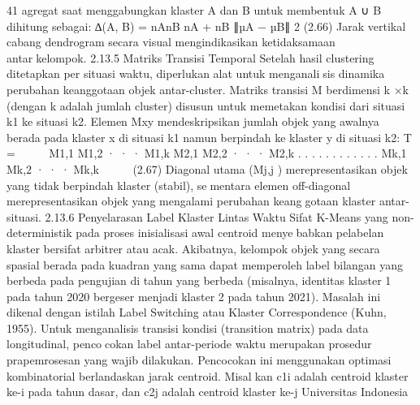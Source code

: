 41
agregat saat menggabungkan klaster A dan B untuk membentuk A ∪ B dihitung sebagai:
∆(A, B) = nAnB
nA + nB
∥µA − µB∥
2
(2.66)
Jarak vertikal cabang dendrogram secara visual mengindikasikan ketidaksamaan antarkelompok.
2.13.5 Matriks Transisi Temporal
Setelah hasil clustering ditetapkan per situasi waktu, diperlukan alat untuk menganalisis dinamika perubahan keanggotaan objek antar-cluster. Matriks transisi M berdimensi
k ×k (dengan k adalah jumlah cluster) disusun untuk memetakan kondisi dari situasi k1 ke
situasi k2. Elemen Mxy mendeskripsikan jumlah objek yang awalnya berada pada klaster
x di situasi k1 namun berpindah ke klaster y di situasi k2:
T =


M1,1 M1,2 · · · M1,k
M2,1 M2,2 · · · M2,k
.
.
.
.
.
.
.
.
.
.
.
.
Mk,1 Mk,2 · · · Mk,k


(2.67)
Diagonal utama (Mj,j ) merepresentasikan objek yang tidak berpindah klaster (stabil), sementara elemen off-diagonal merepresentasikan objek yang mengalami perubahan keanggotaan klaster antar-situasi.
2.13.6 Penyelarasan Label Klaster Lintas Waktu
Sifat K-Means yang non-deterministik pada proses inisialisasi awal centroid menyebabkan pelabelan klaster bersifat arbitrer atau acak. Akibatnya, kelompok objek yang
secara spasial berada pada kuadran yang sama dapat memperoleh label bilangan yang
berbeda pada pengujian di tahun yang berbeda (misalnya, identitas klaster 1 pada tahun
2020 bergeser menjadi klaster 2 pada tahun 2021). Masalah ini dikenal dengan istilah
Label Switching atau Klaster Correspondence (Kuhn, 1955).
Untuk menganalisis transisi kondisi (transition matrix) pada data longitudinal, pencocokan label antar-periode waktu merupakan prosedur prapemrosesan yang wajib dilakukan.
Pencocokan ini menggunakan optimasi kombinatorial berlandaskan jarak centroid. Misalkan c1i adalah centroid klaster ke-i pada tahun dasar, dan c2j adalah centroid klaster ke-j
Universitas Indonesia

